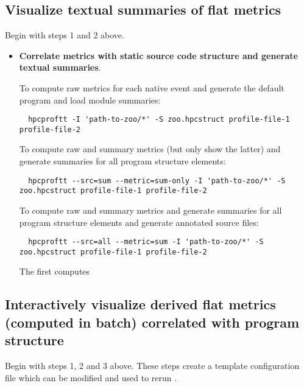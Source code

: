 \documentclass[english]{article}
\begin{document}
\subsection{Visualize textual summaries of flat metrics}

Begin with steps 1 and 2 above.

\begin{itemize}

\item \textbf{Correlate metrics with static source code structure and generate textual summaries}.

To compute raw metrics for each native event and generate the default program and load module summaries:
\begin{verbatim}
  hpcproftt -I 'path-to-zoo/*' -S zoo.hpcstruct profile-file-1 profile-file-2
\end{verbatim}

To compute raw and summary metrics (but only show the latter) and generate summaries for all program structure elements:
\begin{verbatim}
  hpcproftt --src=sum --metric=sum-only -I 'path-to-zoo/*' -S zoo.hpcstruct profile-file-1 profile-file-2
\end{verbatim}

To compute raw and summary metrics and generate summaries for all program structure elements and generate annotated source files:
\begin{verbatim}
  hpcproftt --src=all --metric=sum -I 'path-to-zoo/*' -S zoo.hpcstruct profile-file-1 profile-file-2
\end{verbatim}


The first computes

\end{itemize}


\subsection{Interactively visualize derived flat metrics (computed in batch) correlated with program structure}

Begin with steps 1, 2 and 3 above.
These steps create a template  configuration file which can be modified and used to rerun .
\end{document}
